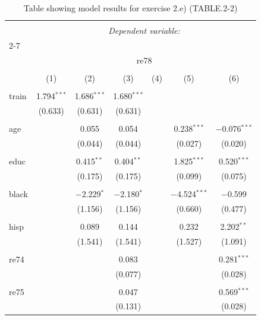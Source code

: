
\begin{table}[!htbp] \centering 
  \caption{Table showing model results for exercise 2.e) (TABLE.2-2)} 
  \label{} 
\begin{tabular}{@{\extracolsep{5pt}}lcccccc} 
\\[-1.8ex]\hline 
\hline \\[-1.8ex] 
 & \multicolumn{6}{c}{\textit{Dependent variable:}} \\ 
\cline{2-7} 
\\[-1.8ex] & \multicolumn{6}{c}{re78} \\ 
\\[-1.8ex] & (1) & (2) & (3) & (4) & (5) & (6)\\ 
\hline \\[-1.8ex] 
 train & 1.794$^{***}$ & 1.686$^{***}$ & 1.680$^{***}$ &  &  &  \\ 
  & (0.633) & (0.631) & (0.631) &  &  &  \\ 
  & & & & & & \\ 
 age &  & 0.055 & 0.054 &  & 0.238$^{***}$ & $-$0.076$^{***}$ \\ 
  &  & (0.044) & (0.044) &  & (0.027) & (0.020) \\ 
  & & & & & & \\ 
 educ &  & 0.415$^{**}$ & 0.404$^{**}$ &  & 1.825$^{***}$ & 0.520$^{***}$ \\ 
  &  & (0.175) & (0.175) &  & (0.099) & (0.075) \\ 
  & & & & & & \\ 
 black &  & $-$2.229$^{*}$ & $-$2.180$^{*}$ &  & $-$4.524$^{***}$ & $-$0.599 \\ 
  &  & (1.156) & (1.156) &  & (0.660) & (0.477) \\ 
  & & & & & & \\ 
 hisp &  & 0.089 & 0.144 &  & 0.232 & 2.202$^{**}$ \\ 
  &  & (1.541) & (1.541) &  & (1.527) & (1.091) \\ 
  & & & & & & \\ 
 re74 &  &  & 0.083 &  &  & 0.281$^{***}$ \\ 
  &  &  & (0.077) &  &  & (0.028) \\ 
  & & & & & & \\ 
 re75 &  &  & 0.047 &  &  & 0.569$^{***}$ \\ 
  &  &  & (0.131) &  &  & (0.028) \\ 

\end{tabular}
\end{table}
